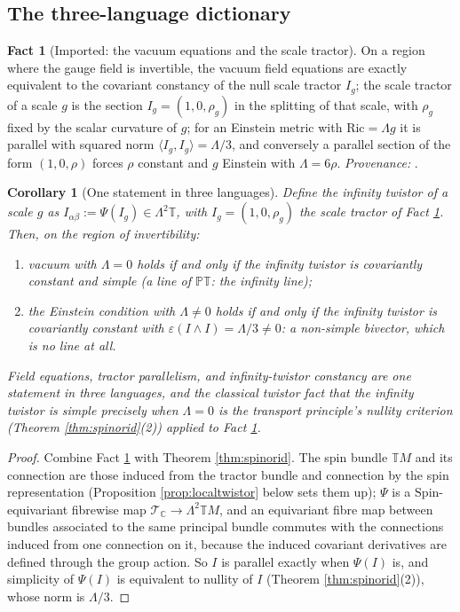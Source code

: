 \documentclass[11pt]{article}
\newtheorem{corollary}[theorem]{Corollary}
\theoremstyle{definition}
\newtheorem{fact}[theorem]{Fact}
\newcommand{\C}{\mathbb{C}}
\newcommand{\T}{\mathbb{T}}
\newcommand{\PT}{\mathbb{PT}}
\newcommand{\ip}[2]{\langle #1, #2\rangle}
\begin{document}
\subsection{The three-language dictionary}\label{subsec:threelang}

\begin{fact}[Imported: the vacuum equations and the scale tractor]\label{fact:vacuumT6}
On a region where the gauge field is invertible, the vacuum field equations are exactly equivalent to the covariant constancy of the null scale tractor $I_g$; the scale tractor of a scale $g$ is the section $I_g = (1, 0, \rho_g)$ in the splitting of that scale, with $\rho_g$ fixed by the scalar curvature of $g$; for an Einstein metric with $\mathrm{Ric} = \Lambda g$ it is parallel with squared norm $\ip{I_g}{I_g} = \Lambda/3$, and conversely a parallel section of the form $(1,0,\rho)$ forces $\rho$ constant and $g$ Einstein with $\Lambda = 6\rho$. \emph{Provenance:} \cite[Thm.~4.5, Thm.~4.7]{ButlerT6}.
\end{fact}

\begin{corollary}[One statement in three languages]\label{cor:threelang}
Define the \emph{infinity twistor} of a scale $g$ as $I_{\alpha\beta} := \Psi(I_g) \in \Lambda^2\T$, with $I_g = (1,0,\rho_g)$ the scale tractor of Fact \ref{fact:vacuumT6}. Then, on the region of invertibility:
\begin{enumerate}
\item vacuum with $\Lambda = 0$ holds if and only if the infinity twistor is covariantly constant and \emph{simple} (a line of $\PT$: the infinity line);
\item the Einstein condition with $\Lambda \neq 0$ holds if and only if the infinity twistor is covariantly constant with $\varepsilon(I\wedge I) = \Lambda/3 \neq 0$: a non-simple bivector, which is no line at all.
\end{enumerate}
Field equations, tractor parallelism, and infinity-twistor constancy are one statement in three languages, and the classical twistor fact that the infinity twistor is simple precisely when $\Lambda = 0$ is the transport principle's nullity criterion (Theorem \ref{thm:spinorid}(2)) applied to Fact \ref{fact:vacuumT6}.
\end{corollary}

\begin{proof}
Combine Fact \ref{fact:vacuumT6} with Theorem \ref{thm:spinorid}. The spin bundle $\T M$ and its connection are those induced from the tractor bundle and connection by the spin representation (Proposition \ref{prop:localtwistor} below sets them up); $\Psi$ is a $\mathrm{Spin}$-equivariant fibrewise map $\mathcal{T}_\C \to \Lambda^2\T M$, and an equivariant fibre map between bundles associated to the same principal bundle commutes with the connections induced from one connection on it, because the induced covariant derivatives are defined through the group action. So $I$ is parallel exactly when $\Psi(I)$ is, and simplicity of $\Psi(I)$ is equivalent to nullity of $I$ (Theorem \ref{thm:spinorid}(2)), whose norm is $\Lambda/3$.
\end{proof}
\end{document}
